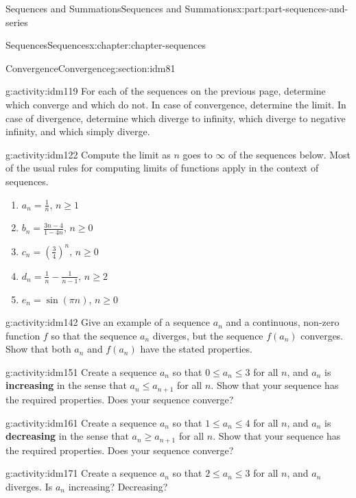 \documentclass[oneside,10pt,]{book}
\newcommand{\terminology}[1]{\textbf{#1}}
\numberwithin{equation}{section}
\begin{document}
\begin{partptx}{Sequences and Summations}{}{Sequences and Summations}{}{}{x:part:part-sequences-and-series}
\begin{chapterptx}{Sequences}{}{Sequences}{}{}{x:chapter:chapter-sequences}
\begin{sectionptx}{Convergence}{}{Convergence}{}{}{g:section:idm81}
\begin{activity}{}{g:activity:idm119}%
For each of the sequences on the previous page, determine which converge and which do not. In case of convergence, determine the limit. In case of divergence, determine which diverge to infinity, which diverge to negative infinity, and which simply diverge.%
\end{activity}
\begin{activity}{}{g:activity:idm122}%
Compute the limit as \(n\) goes to \(\infty\) of the sequences below. Most of the usual rules for computing limits of functions apply in the context of sequences.%
\begin{enumerate}[font=\bfseries,label=(\alph*),ref=\alph*]
\item{}\(a_n = \frac{1}{n}\), \(n \geq 1\)\item{}\(b_n = \frac{3n-4}{1-4n}\), \(n \geq 0\)\item{}\(c_n = \left(\frac{3}{4}\right)^n\), \(n \geq 0\)\item{}\(d_n = \frac{1}{n} - \frac{1}{n-1}\), \(n \geq 2\)\item{}\(e_n = \sin(\pi n)\), \(n \geq 0\)\end{enumerate}
\end{activity}
\begin{activity}{}{g:activity:idm142}%
Give an example of a sequence \(a_n\) and a continuous, non-zero function \(f\) so that the sequence \(a_n\) diverges, but the sequence \(f(a_n)\) converges. Show that both \(a_n\) and \(f(a_n)\) have the stated properties.%
\end{activity}
\begin{activity}{}{g:activity:idm151}%
Create a sequence \(a_n\) so that \(0 \leq a_n \leq 3\) for all \(n\), and \(a_n\) is \terminology{increasing} in the sense that \(a_n \leq a_{n+1}\) for all \(n\). Show that your sequence has the required properties. Does your sequence converge?%
\end{activity}
\begin{activity}{}{g:activity:idm161}%
Create a sequence \(a_n\) so that \(1 \leq a_n \leq 4\) for all \(n\), and \(a_n\) is \terminology{decreasing} in the sense that \(a_n \geq a_{n+1}\) for all \(n\). Show that your sequence has the required properties. Does your sequence converge?%
\end{activity}
\begin{activity}{}{g:activity:idm171}%
Create a sequence \(a_n\) so that \(2 \leq a_n \leq 3\) for all \(n\), and \(a_n\) diverges. Is \(a_n\) increasing? Decreasing?%

\end{activity}
\end{sectionptx}
\end{chapterptx}
\end{partptx}
\end{document}
